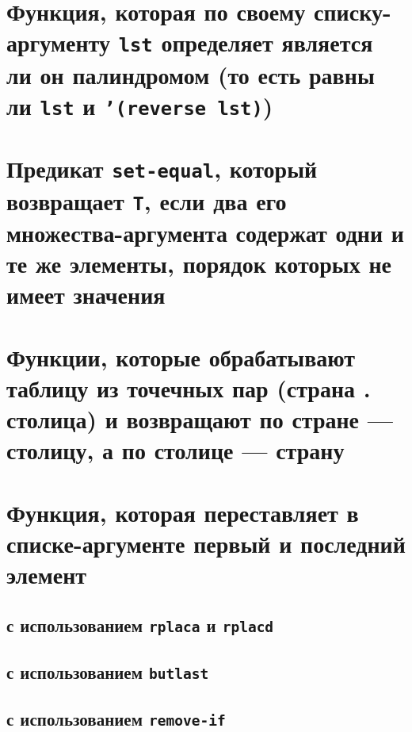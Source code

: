 
\section{Функция, которая по своему списку-аргументу \texttt{lst} определяет является ли он палиндромом (то есть равны ли \texttt{lst} и \texttt{'(reverse lst)})}



\section{Предикат \texttt{set-equal}, который возвращает \texttt{T}, если два его множества-аргу\-мента содержат одни и те же элементы, порядок которых не имеет значения}




\section{Функции, которые обрабатывают таблицу из точечных пар (страна . столица) и возвращают по стране --- столицу, а по столице --- страну}




\section{Функция, которая переставляет в списке-аргументе первый и последний элемент}


\subsection{с использованием \texttt{rplaca} и \texttt{rplacd}}



\subsection{с использованием \texttt{butlast}}



\subsection{с использованием \texttt{remove-if}}

